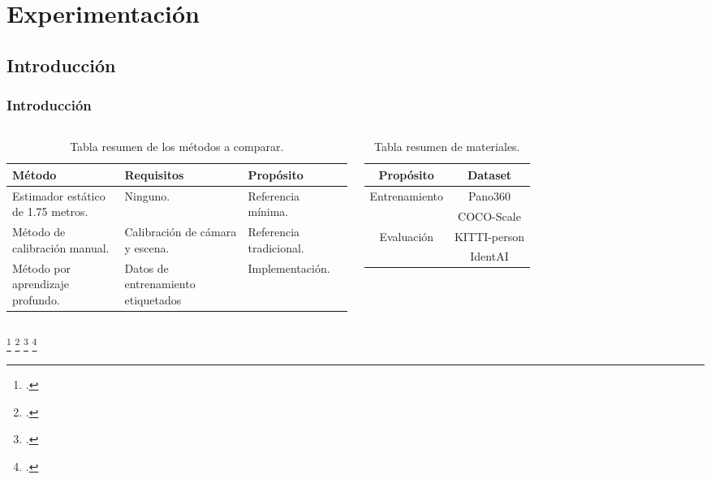 \section{Experimentación}
\subsection{Introducción}
\begin{frame}
  \frametitle{Introducción}
  \begin{columns}
\begin{table}[!ht]
  \centering
  \scriptsize
  \begin{tabularx}{\linewidth}{|X|X|X|} \hline
\rowcolor[HTML]{FFCB2F}
\textbf{Método} & \textbf{Requisitos} & \textbf{Propósito} \\
\hline
Estimador estático de 1.75 metros. & Ninguno. & Referencia mínima.\\
\hline
Método de calibración manual. & Calibración de cámara y escena. & Referencia tradicional. \\
\hline
Método por aprendizaje profundo. & Datos de entrenamiento etiquetados & Implementación.\\
\hline
\end{tabularx}
\caption[Tabla resumen de los métodos a comparar.]{
  Tabla resumen de los métodos a comparar.
}
\end{table}
\begin{table}[!ht]
  \scriptsize
  \centering
  \begin{tabular}{|c|c|}
    \hline
    \rowcolor[HTML]{FFCB2F}
    \textbf{Propósito} & \textbf{Dataset}\\
    \hline
    \multirow{2}{*}{Entrenamiento} & Pano360\footnotemark \\
    \cline{2-2}
                                   & COCO-Scale\footnotemark\\
    \hline
    \multirow{2}{*}{Evaluación} & KITTI-person\footnotemark\\
    \cline{2-2}
                                & IdentAI\footnotemark\\
    \hline
  \end{tabular}
  \caption{Tabla resumen de materiales.}
\end{table}
\end{columns}
\addtocounter{footnote}{-3}
\footcitetext{SPEC}
\footcitetext{SVMIW}
\footcitetext{Kitti}
\footcitetext{panacea2026}
\end{frame}

